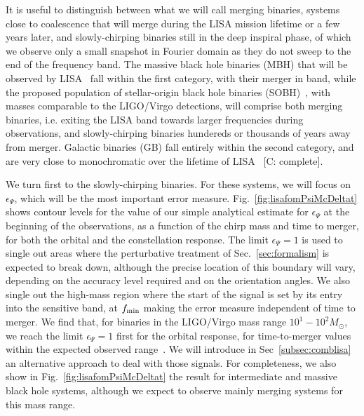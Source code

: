 \documentclass[aps,showpacs,twocolumn,
prd,superscriptaddress,nofootinbib]{revtex4-1}
\newcommand{\Msol}{M_{\odot}}
\newcommand{\SM}[1]{{\color{Red} #1}}
\newcommand{\jgb}[1]{{\color{DarkGreen} #1}}
\begin{document}
\jgb{It is useful to distinguish} between what we will call merging binaries, systems close to coalescence that will merge during the LISA mission lifetime or a few years later, and slowly-chirping binaries still in the deep inspiral phase, of which we observe only a small snapshot in Fourier domain as they do not sweep to the end of the frequency band. The massive black hole binaries (MBH) that will be observed by LISA~\cite{LISA17} fall within the first category, with their merger in band, while the proposed population of stellar-origin black hole binaries (SOBH)~\cite{Sesana16}, with masses comparable to the LIGO/Virgo detections, will comprise both merging binaries, i.e. exiting the LISA band towards larger frequencies during observations, and slowly-chirping binaries hundereds or thousands of years away from merger. Galactic binaries (GB) fall entirely within the second category, and are very close to monochromatic over the lifetime of LISA~\cite{LISA17} \SM{[C: complete]}.

We turn first to the slowly-chirping binaries. For these systems, we will focus on $\epsilon_{\Psi}$, which will be the most important error measure. Fig.~\ref{fig:lisafomPsiMcDeltat} shows contour levels for the value of our simple analytical estimate for $\epsilon_{\Psi}$ at the beginning of the observations, as a function of the chirp mass and time to merger, for both the orbital and the constellation response. The limit $\epsilon_{\Psi} = 1$ is used to single out areas where the perturbative treatment of Sec.~\ref{sec:formalism} is expected to break down, although the precise location of this boundary will vary, depending on the accuracy level required and on the orientation angles. We also single out the high-mass region where the start of the signal is set by its entry \jgb{into the sensitive band, at $f_{\rm min}$ making the error measure independent of time to merger}. We find that, for binaries in the LIGO/Virgo mass range $10^{1}-10^{2} \Msol$, we reach the limit $\epsilon_{\Psi}=1$ first for the orbital response, for time-to-merger values within the expected observed range~\cite{Sesana16}. We will introduce in Sec~\ref{subsec:comblisa} an alternative approach to deal with those signals. For completeness, we also show in Fig.~\ref{fig:lisafomPsiMcDeltat} the result for intermediate and massive black hole systems, although we expect to observe mainly merging systems for this mass range. 
\end{document}
